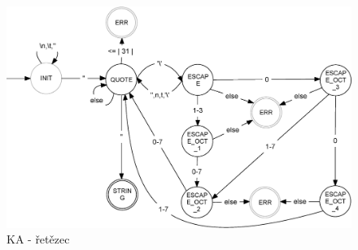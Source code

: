 \documentclass[a4paper,11pt]{article}
\begin{document}
\newpage
\begin{figure}[H]
	\centering
	\includegraphics[scale=.31]{FSM_STRING.eps}
	\caption{KA - řetězec}
\end{figure}
\end{document}
